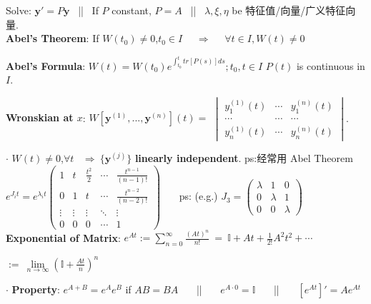 \documentclass[8pt]{extarticle}
\begin{document}
\begin{minipage}[t]{0.39\textwidth}

    Solve: $\mathbf{y}'=P\mathbf{y}$ \ || \ If $P$ constant, $P=A$ \ || \ $\lambda,\xi,\eta$ be 特征值/向量/广义特征向量. \\

    \textbf{Abel's Theorem}: If $W(t_0)\ne0$,$t_0\in I$ \ \ $\Rightarrow$ \ \ $\forall t\in I,W(t)\ne0$

    \textbf{Abel's Formula}: $W(t)=W(t_0)e^{\int^t_{t_0}tr[P(s)] ds};t_0,t\in I$ {\tiny $P(t)$ is continuous in $I$.}

    \textbf{Wronskian at $x$}: $W[\mathbf{y}^{(1)},...,\mathbf{y}^{(n)}](t)=$ {\tiny $\begin{vmatrix}y^{(1)}_1(t) & \cdots & y^{(n)}_1(t) \\ \cdots & \cdots & \cdots\\ y^{(1)}_n(t) & \cdots &y^{(n)}_n(t) \end{vmatrix}$}.

    $\cdot$ $W(t)\ne0$,$\forall t$ \ $\Rightarrow \ \{\mathbf{y}^{(j)}\}$ \textbf{linearly independent}. { ps:经常用 Abel Theorem} \\

    {\tiny $e^{J_it}=e^{\lambda_i t}\begin{pmatrix} 1 & t & \frac{t^2}{2} & \cdots & \frac{t^{n-1}}{(n-1)!} \\ 0 & 1 & t & \cdots & \frac{t^{n-2}}{(n-2)!} \\ \vdots & \vdots & \vdots & \ddots & \vdots \\ 0 & 0 & 0 & \cdots & 1 \end{pmatrix}$} \ \ \ ps: (e.g.) $J_3=\begin{pmatrix}\lambda & 1 & 0 \\ 0 & \lambda & 1 \\ 0 & 0 & \lambda\end{pmatrix}$ \\

    \textbf{Exponential of Matrix}: $e^{At}:=\sum_{n=0}^{\infty}\frac{(At)^n}{n!} \ = \ \mathbb{I}+At+\frac{1}{2!}A^2t^2+\cdots$

    \hspace{115pt} $:= \ \lim\limits_{n\to\infty}(\mathbb{I}+\frac{At}{n})^n$

    $\cdot$ \textbf{Property}: $e^{A+B}=e^{A}e^{B}$ if $AB=BA$ \ \ \ || \ \ \ $e^{A\cdot0}=\mathbb{I}$ \ \ \ || \ \ \ $[e^{At}]'=Ae^{At}$

\end{minipage}
\end{document}
